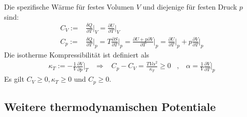 \begin{definition}
    Die spezifische Wärme für festes Volumen $V$ und diejenige für
    festen Druck $p$ sind:
    \begin{align*}
        C_V :=& \frac{\delta Q}{\partial T} \Big|_{V}
        = \frac{\partial U}{\partial T} \Big|_{V}
        \\
        C_p :=& \frac{\delta Q}{\partial T} \Big|_{p}
            = T \frac{\partial S}{\partial T} \Big|_{p}
            = \frac{\partial U + p \partial V}{\partial T} \Big|_{p}
            = \frac{\partial U}{\partial T} \Big|_{p} + p \frac{\partial V}{\partial T} \Big|_{p}
    \end{align*}
    Die isotherme Kompressibilität ist definiert als
    \begin{align*}
        \kappa_T := - \frac{1}{V} \frac{\partial V}{\partial p} \Big|_{T}
        \hspace{10pt} \Rightarrow \hspace{10pt}
        C_p - C_V = \frac{T V \alpha^2}{\kappa_T} \geq 0
        \hspace{10pt} , \hspace{10pt}
        \alpha = \frac{1}{V} \frac{\partial V}{\partial T} \Big|_p
    \end{align*}
    Es gilt $C_V \geq 0, \kappa_T \geq 0$ und $C_p \geq 0$.
\end{definition}


\subsection{Weitere thermodynamischen Potentiale}



